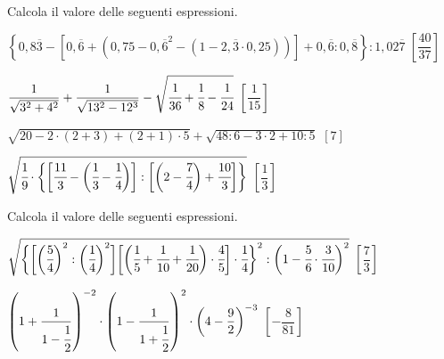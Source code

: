 \begin{esercizio}[\Ast]
\label{ese:3.157}
 Calcola il valore delle seguenti espressioni.
\begin{enumeratea}
\spazielenx
\item \(\displaystyle{\left\{0,8\overline{3}-\left[0,\overline{6}+(0,75-{0,
\overline{6}}^{2}-(1-2,\overline{3}\cdot%
0,25))\right]+0,\overline{6}:0,\overline{8}\right\}:1,02\overline{7}}\)
  \hfill \(\left[\dfrac{40}{37} \right]\)
\item \(\displaystyle{\frac{1}{\sqrt{3^{2}+4^{2}}}+\frac{1}{\sqrt{13^{2}-12^3}}-
\sqrt{\cfrac{1}{36}+\cfrac{1}{8}%
-\cfrac{1}{24}}}\)
  \hfill \(\left[\dfrac{1}{15} \right]\)
\item \(\displaystyle{\sqrt{20-2\cdot(2+3)+(2+1)\cdot5}+\sqrt{48:6-3
\cdot2+10:5}}\)
  \hfill \(\left[7 \right]\)
\item \(\displaystyle{\sqrt{\cfrac{1}{9}\cdot\bigg\{\bigg[\cfrac{11}{3}-
\bigg(\cfrac{1}{3}-\cfrac{1}{4}\bigg)\bigg]:%
\bigg[\bigg(2-\cfrac{7}{4}\bigg)+\cfrac{10}{3}\bigg]\bigg\}}}\)
  \hfill \(\left[\dfrac{1}{3} \right]\)
\end{enumeratea}
\end{esercizio}

\begin{esercizio}[\Ast]
\label{ese:3.158}
 Calcola il valore delle seguenti espressioni.
\begin{enumeratea}
\spazielenx
\item \(\displaystyle{\sqrt{\bigg\{\bigg[\bigg(\cfrac{5}{4}\bigg)^{2}:
\bigg(\cfrac{1}{4}\bigg)^{2}\bigg]%
\bigg[\bigg(\cfrac{1}{5}+\cfrac{1}{10}+\cfrac{1}{20}\bigg)\cdot\cfrac{4}{5}
\bigg]\cdot\cfrac{1}{4}\bigg\}^{2}%
:\bigg(1-\cfrac{5}{6}\cdot\cfrac{3}{10}\bigg)^{2}}}\)
  \hfill \(\left[\dfrac{7}{3} \right]\)
\item \(\displaystyle{\left(1+\frac{1}{1-\cfrac{1}{2}}\right)^{-2}\cdot
\left(1-\frac{1}{1+\cfrac{1}{2}}\right)^{2}\cdot%
\bigg(4-\frac{9}{2}\bigg)^{-3}}\)
  \hfill \(\left[-\dfrac{8}{81} \right]\)
\end{enumeratea}
\end{esercizio}

